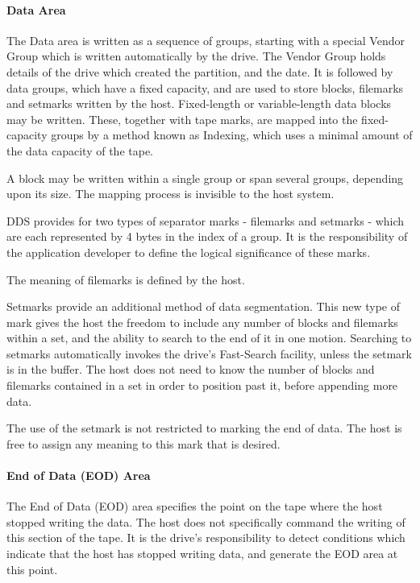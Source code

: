 \documentclass[11pt]{article}
\begin{document}
\paragraph {Data Area}

The Data area is written as a sequence of groups, starting with a special
Vendor Group which is written automatically by the drive. The Vendor Group
holds details of the drive which created the partition, and the date. It is
followed by data groups, which have a fixed capacity, and are used to store
blocks, filemarks and setmarks written by the host. Fixed-length or
variable-length data blocks may be written. These, together with tape marks,
are mapped into the fixed-capacity groups by a method known as Indexing,
which uses a minimal amount of the data capacity of the tape.

A block may be written within a single group or span several groups,
depending upon its size. The mapping process is invisible to the host system.

DDS provides for two types of separator marks - filemarks and setmarks -
which are each represented by 4 bytes in the index of a group. It is the
responsibility of the application developer to define the logical
significance of these marks.

The meaning of filemarks is defined by the host.

Setmarks provide an additional method of data segmentation. This new type
of mark gives the host the freedom to include any number of blocks and
filemarks within a set, and the ability to search to the end of it in one
motion. Searching to setmarks automatically invokes the drive's Fast-Search
facility, unless the setmark is in the buffer. The host does not need to
know the number of blocks and filemarks contained in a set in order to
position past it, before appending more data.

The use of the setmark is not restricted to marking the end of data. The
host is free to assign any meaning to this mark that is desired.

\paragraph {End of Data (EOD) Area}

The End of Data (EOD) area specifies the point on the tape where the host
stopped writing the data. The host does not specifically command the writing
of this section of the tape. It is the drive's responsibility to detect
conditions which indicate that the host has stopped writing data, and generate
the EOD area at this point.
\end{document}
